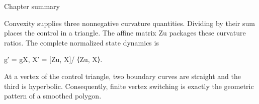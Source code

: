 \begin{insightbox}{Chapter summary}
\end{insightbox}

Convexity supplies three nonnegative curvature quantities. Dividing by their sum places the control in a triangle. The affine matrix Zu packages these curvature ratios. The complete normalized state dynamics is


\begin{displaytext}
g′ = gX, X′ = [Zu, X]/ ⟨Zu, X⟩.
\end{displaytext}

At a vertex of the control triangle, two boundary curves are straight and the third is hyperbolic. Consequently, finite vertex switching is exactly the geometric pattern of a smoothed polygon.

